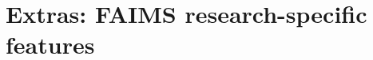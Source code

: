 \documentclass[aspectratio=169, 12pt]{beamer} %
\begin{document}
    
    
    
    

\section{Extras: FAIMS research-specific features}
\end{document}
